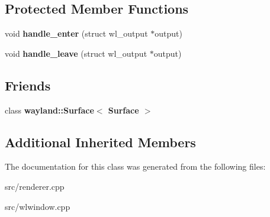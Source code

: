 \subsection*{Protected Member Functions}
\begin{DoxyCompactItemize}
\item 
\mbox{\label{classSurface_a71996830e55f2585cf3382687c9f0e42}} 
void {\bfseries handle\+\_\+enter} (struct wl\+\_\+output $\ast$output)
\item 
\mbox{\label{classSurface_ad09253d21742377026386e852b2b3e18}} 
void {\bfseries handle\+\_\+leave} (struct wl\+\_\+output $\ast$output)
\end{DoxyCompactItemize}
\subsection*{Friends}
\begin{DoxyCompactItemize}
\item 
\mbox{\label{classSurface_ab03fc066846d0712c7a07934900feeac}} 
class {\bfseries wayland\+::\+Surface$<$ Surface $>$}
\end{DoxyCompactItemize}
\subsection*{Additional Inherited Members}


The documentation for this class was generated from the following files\+:\begin{DoxyCompactItemize}
\item 
src/renderer.\+cpp\item 
src/wlwindow.\+cpp\end{DoxyCompactItemize}
